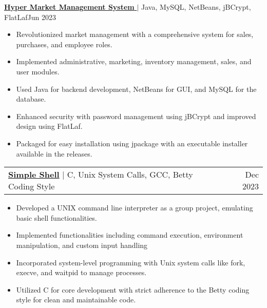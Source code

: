 \documentclass[letterpaper,10.5pt]{article}
\makeatletter
\newcommand{\resumeItem}[1]{
  \item\small{
    {#1 \vspace{-2pt}}
  }
}
\newcommand{\resumeProjectHeading}[2]{
    \vspace{-2pt}\item
    \begin{tabular*}{0.97\textwidth}{l@{\extracolsep{\fill}}r}
      \small#1 & #2 \\
    \end{tabular*}\vspace{-7pt}
}
\newcommand{\resumeItemListStart}{\begin{itemize}}
\newcommand{\resumeItemListEnd}{\end{itemize}\vspace{-5pt}}
\makeatother
\begin{document}
        {\href{https://github.com/Hassan220022/Hyper-Market-Management-System}{\textbf{Hyper Market Management System }}
        $|$
          {Java, MySQL, NetBeans, jBCrypt, FlatLaf}}{Jun 2023}
          \resumeItemListStart
            \resumeItem{Revolutionized market management with a comprehensive system for sales, purchases, and employee roles.}
            \resumeItem{Implemented administrative, marketing, inventory management, sales, and user modules.}
            \resumeItem{Used Java for backend development, NetBeans for GUI, and MySQL for the database.}
            \resumeItem{Enhanced security with password management using jBCrypt and improved design using FlatLaf.}
            \resumeItem{Packaged for easy installation using jpackage with an executable installer available in the releases.}
          \resumeItemListEnd

      \resumeProjectHeading
        {\href{https://github.com/Hassan220022/simple_shell}{\textbf{Simple Shell}}
        $|$
          {C, Unix System Calls, GCC, Betty Coding Style}}{Dec 2023}
          \resumeItemListStart
            \resumeItem{Developed a UNIX command line interpreter as a group project, emulating basic shell functionalities.}
            \resumeItem{Implemented functionalities including command execution, environment manipulation, and custom input handling}
            \resumeItem{Incorporated system-level programming with Unix system calls like fork, execve, and waitpid to manage processes.}
            \resumeItem{Utilized C for core development with strict adherence to the Betty coding style for clean and maintainable code.}
          \resumeItemListEnd

\end{document}
